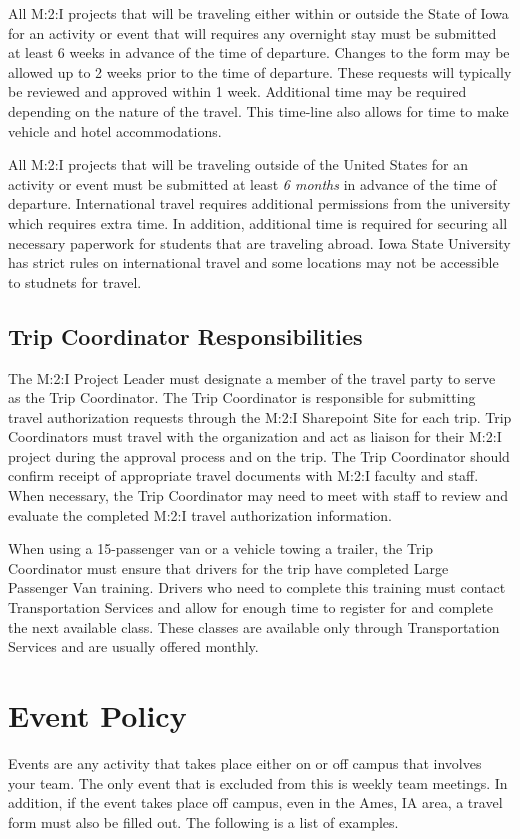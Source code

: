 {All M:2:I projects that will be traveling either within or outside the State of Iowa for an activity or event that will requires any overnight stay must be submitted at least 6 weeks in advance of the time of departure.  Changes to the form may be allowed up to 2 weeks prior to the time of departure.  These requests will typically be reviewed and approved within 1 week.  Additional time may be required depending on the nature of the travel.  This time-line also allows for time to make vehicle and hotel accommodations.

All M:2:I projects that will be traveling outside of the United States for an activity or event must be submitted at least \emph{6 months} in advance of the time of departure.  International travel requires additional permissions from the university which requires extra time.  In addition, additional time is required for securing all necessary paperwork for students that are traveling abroad.  Iowa State University has strict rules on international travel and some locations may not be accessible to studnets for travel.

\section{Trip Coordinator Responsibilities}
The M:2:I Project Leader must designate a member of the travel party to serve as the Trip Coordinator. The Trip Coordinator is responsible for submitting travel authorization requests through the M:2:I Sharepoint Site for each trip. Trip Coordinators must travel with the organization and act as liaison for their M:2:I project during the approval process and on the trip. The Trip Coordinator should confirm receipt of appropriate travel documents with M:2:I faculty and staff. When necessary, the Trip Coordinator may need to meet with staff to review and evaluate the completed M:2:I travel authorization information.

When using a 15-passenger van or a vehicle towing a trailer, the Trip Coordinator must ensure that drivers for the trip have completed Large Passenger Van training. Drivers who need to complete this training must contact Transportation Services and allow for enough time to register for and complete the next available class. These classes are available only through Transportation Services and are usually offered monthly.

\chapter{Event Policy}
Events are any activity that takes place either on or off campus that involves your team.  The only event that is excluded from this is weekly team meetings.  In addition, if the event takes place off campus, even in the Ames, IA area, a travel form must also be filled out.  The following is a list of examples.

}
